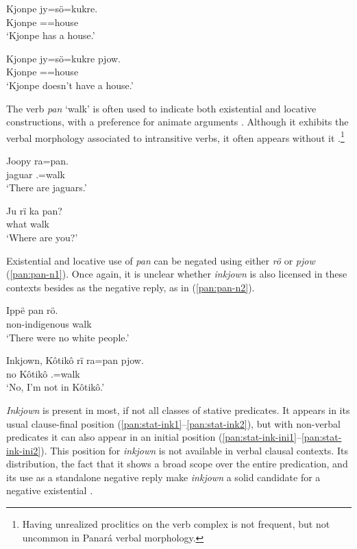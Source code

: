 \documentclass[output=paper,colorlinks,citecolor=brown,draft]{langscibook}
\begin{document}
\ea\label{pan:verb-poss}
    \gll Kjonpe jy=sö=kukre. \\
    Kjonpe \Intr{}=\Poss{}=house \\
    \glt `Kjonpe has a house.' \\
\z

\ea\label{pan:verb-poss-neg}
    \gll Kjonpe jy=sö=kukre pjow. \\
    Kjonpe \Intr{}=\Poss{}=house \Neg{} \\
    \glt `Kjonpe doesn't have a house.' \\
\z

The verb \textit{pan} `walk' is often used to indicate both existential and locative constructions, with a preference for animate arguments . Although it exhibits the verbal morphology associated to intransitive verbs, it often appears without it .\footnote{Having unrealized proclitics on the verb complex is not frequent, but not uncommon in Panará verbal morphology.} 

\ea\label{pan:pan-1a}
    \gll Joopy ra=pan. \\
    jaguar \Tpl.\Abs{}=walk \\
    \glt `There are jaguars.' \\
\z

\ea\label{pan:pan-1b}
    \gll Ju rï ka pan? \\
    what \Loc{} \Ssg{} walk \\
    \glt `Where are you?' \\
\z

Existential and locative use of \textit{pan} can be negated using either \textit{rö} or \textit{pjow} (\ref{pan:pan-n1}). Once again, it is unclear whether \textit{inkjown} is also licensed in these contexts besides as the negative reply, as in (\ref{pan:pan-n2}).

\ea\label{pan:pan-n1}
    \gll Ippë pan rö. \\
    non-indigenous walk \Neg{} \\
    \glt `There were no white people.' \\
\z

\ea\label{pan:pan-n2}
    \gll Inkjown, Kôtikô rï ra=pan pjow. \\
    no Kôtikô \Loc{} \Fsg.\Abs{}=walk \Neg{} \\
    \glt `No, I'm not in Kôtikô.' \\
\z

\textit{Inkjown} is present in most, if not all classes of stative predicates. It appears in its usual clause-final position (\ref{pan:stat-ink1}--\ref{pan:stat-ink2}), but with non-verbal predicates it can also appear in an initial position (\ref{pan:stat-ink-ini1}--\ref{pan:stat-ink-ini2}). This position for \textit{inkjown} is not available in verbal clausal contexts. Its distribution, the fact that it shows a broad scope over the entire predication, and its use as a standalone negative reply make \textit{inkjown} a solid candidate for a negative existential \citep{Veselinova2013neg.exist}.
\end{document}
